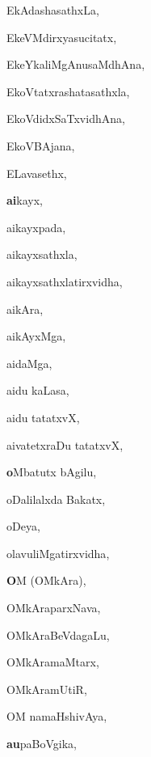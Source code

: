 \begin{multicols}{3}
{\noindent
{EkAdashasathxLa}, \pageref{EkAdashasathxLa}

\noindent
{EkeVMdirxyasucitatx}, \pageref{EkeVMdirxyasucitatx}

\noindent
{EkeYkaliMgAnusaMdhAna}, \pageref{EkeYkaliMgAnusaMdhAna}

\noindent
{EkoVtatxrashatasathxla}, \pageref{EkoVtatxrashatasathxla}

\noindent
{EkoVdidxSaTxvidhAna}, \pageref{EkoVdidxSaTxvidhAna}

\noindent
{EkoVBAjana}, \pageref{EkoVBAjana}

\noindent
{ELavasethx}, \pageref{ELavasethx}

\noindent
{{\large\textbf{ai}}kayx}, \pageref{aikayx-1}

\noindent
{aikayxpada}, \pageref{aikayxpada}

\noindent
{aikayxsathxla}, \pageref{aikayxsathxla}

\noindent
{aikayxsathxlatirxvidha}, \pageref{aikayxsathxlatirxvidha}

\noindent
{aikAra}, \pageref{aikAra}

\noindent
{aikAyxMga}, \pageref{aikAyxMga}

\noindent
{aidaMga}, \pageref{aidaMga}

\noindent
{aidu kaLasa}, \pageref{aidu kaLasa}

\noindent
{aidu tatatxvX}, \pageref{aidu tatatxvX}

\noindent
{aivatetxraDu tatatxvX}, \pageref{aivatetxraDu tatatxvX}

\noindent
{{\large\textbf{o}}Mbatutx bAgilu}, \pageref{oMbatutx bAgilu}

\noindent
{oDalilalxda Bakatx}, \pageref{oDalilalxda Bakatx}

\noindent
{oDeya}, \pageref{oDeya}

\noindent
{olavuliMgatirxvidha}, \pageref{olavuliMgatirxvidha}

\noindent
{{\large\textbf{O}}M (OMkAra)}, \pageref{OM (OMkAra)}

\noindent
{OMkAraparxNava}, \pageref{OMkAraparxNava}

\noindent
{OMkAraBeVdagaLu}, \pageref{OMkAraBeVdagaLu}

\noindent
{OMkAramaMtarx}, \pageref{OMkAramaMtarx}

\noindent
{OMkAramUtiR}, \pageref{OMkAramUtiR}

\noindent
{OM namaHshivAya}, \pageref{OM namaHshivAya}

\noindent
{{\large\textbf{au}}paBoVgika}, \pageref{aupaBoVgika}

}
\end{multicols}
